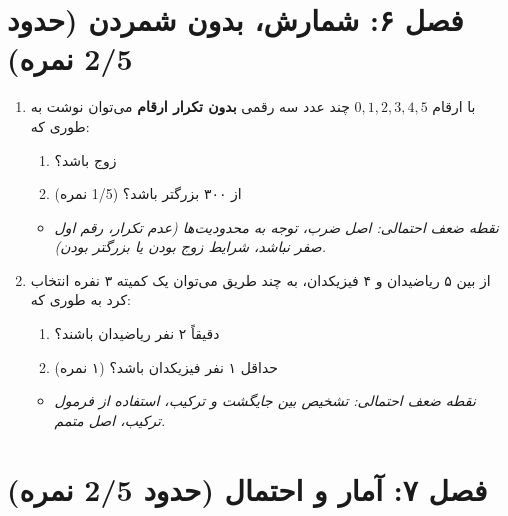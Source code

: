 \documentclass[12pt,a4paper]{article}
\begin{document}
\hrulefill
\vspace{1em}

\section*{\textbf{فصل ۶: شمارش، بدون شمردن (حدود 2/5 نمره)}}

\begin{enumerate}[label=\arabic*., start=15, rightmargin=1em, itemsep=1em]
    \item با ارقام $0, 1, 2, 3, 4, 5$ چند عدد سه رقمی \textbf{بدون تکرار ارقام} می‌توان نوشت به طوری که:
    \begin{enumerate}[label=\abjad*), itemsep=0.5em]
        \item زوج باشد؟
        \item از ۳۰۰ بزرگتر باشد؟ (1/5 نمره)
    \end{enumerate}
    \begin{itemize}[label=$\circ$, rightmargin=2em]
        \item \textit{نقطه ضعف احتمالی: اصل ضرب، توجه به محدودیت‌ها (عدم تکرار، رقم اول صفر نباشد، شرایط زوج بودن یا بزرگتر بودن).}
    \end{itemize}

    \item از بین ۵ ریاضیدان و ۴ فیزیکدان، به چند طریق می‌توان یک کمیته ۳ نفره انتخاب کرد به طوری که:
    \begin{enumerate}[label=\abjad*), itemsep=0.5em]
        \item دقیقاً ۲ نفر ریاضیدان باشند؟
        \item حداقل ۱ نفر فیزیکدان باشد؟ (۱ نمره)
    \end{enumerate}
    \begin{itemize}[label=$\circ$, rightmargin=2em]
        \item \textit{نقطه ضعف احتمالی: تشخیص بین جایگشت و ترکیب، استفاده از فرمول ترکیب، اصل متمم.}
    \end{itemize}
\end{enumerate}

\hrulefill
\vspace{1em}

\section*{\textbf{فصل ۷: آمار و احتمال (حدود 2/5 نمره)}}
\end{document}
